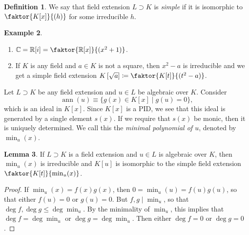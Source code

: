 \documentclass[10pt,letterpaper,cm]{nupset}
\theoremstyle{definition}
\newtheorem{definition}{Definition}[subsection]
\newtheorem{exmp}[definition]{Example}
\theoremstyle{theorem}
\newtheorem{lemma}[definition]{Lemma}
\theoremstyle{remark}
\newcommand{\C}{\mathbb C}
\newcommand{\R}{\mathbb R}
\newcommand{\1}{\mathbf{1}}
\newcommand{\0}{\vec 0}
\DeclareMathOperator{\ann}{ann}
\begin{document}
\begin{definition}
We say that field extension $L \supset K$ is \textit{simple} if it is isomorphic to $\faktor{K[x]}{(h)}$ for some irreducible $h$.
\end{definition}

\begin{exmp} $ $
\begin{enumerate}
\item $\C = \R[i] = \faktor{\R[x]}{(x^2 +1)}$.
\item If $K$ is any field and $a\in K$ is not a square, then $x^2 -a$ is irreducible and we get a simple field extension $K\left[\sqrt{a}\right] \coloneqq \faktor{K[t]}{(t^2 -a)}$.
\end{enumerate}
\end{exmp}

\smallskip

Let $L \supset K$ be any field extension and $u\in L$ be algebraic over $K$. Consider $$\ann(u) \equiv  \{g(x) \in K[x] \mid g(u) =0\},$$ which is an ideal in $K[x]$. Since $K[x]$ is a PID, we see that this ideal is generated by a single element $s(x)$. If we require that $s(x)$ be monic, then it is uniquely determined. We call this the \textit{minimal polynomial of $u$}, denoted by $\min_u(x)$. 


\begin{lemma}\label{LL}
If $L \supset K$ is a field extension and $u\in L$ is algebraic over $K$, then $\min_u(x)$ is irreducible and $K[u]$ is isomorphic to the simple field extension $\faktor{K[t]}{\min_u(x)}$.
\end{lemma}
\begin{proof}
If $\min_u(x) = f(x)g(x)$, then $0 = \min_u(u) = f(u) g(u)$, so that either $f(u) = 0$ or $g(u) =0$. But $f,g \mid \min_u$, so that $\deg{f}, \deg{g} \leq \deg{\min_u}$. By the minimality of $\min_u$, this implies that $\deg{f} = \deg{\min_u}$ or $\deg{g} = \deg{\min_u}$. Then either $\deg{f} =0$ or $\deg{g} =0$. 
\end{proof}
\end{document}
